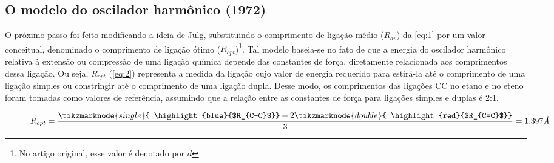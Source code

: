 \subsection{O modelo do oscilador harmônico (1972)}

O próximo passo foi feito modificando a ideia de Julg, substituindo o comprimento de ligação médio ($R_{av}$) da \autoref{eq:1} por um valor conceitual, denominado o comprimento de ligação ótimo ($R_{opt}$)\footnote{No artigo original\autocite{Kruszewski1972}, esse valor é denotado por $d$}. Tal modelo baseia-se no fato de que a energia do oscilador harmônico relativa à extensão ou compressão de uma ligação química depende das constantes de força, diretamente relacionada aos comprimentos dessa ligação. Ou seja, $R_{opt}$ (\autoref{eq:2}) representa a medida da ligação cujo valor de energia requerido para estirá-la até o comprimento de uma ligação simples ou constringir até o comprimento de uma ligação dupla. Desse modo, os comprimentos das ligações CC no etano e no eteno foram tomadas como valores de referência, assumindo que a relação entre as constantes de força para ligações simples e duplas é 2:1.

\begin{figure}[htb]
    \vspace{2\baselineskip}
\begin{equation}
    \label{eq:2}
    R_{opt} = \frac{ \tikzmarknode{single}{ \highlight{blue}{$R_{C-C}$}} + 2 \tikzmarknode{double}{ \highlight{red}{$R_{C=C}$}}}{3} = 1.397 \textit{\AA}
\end{equation}
\end{figure}

